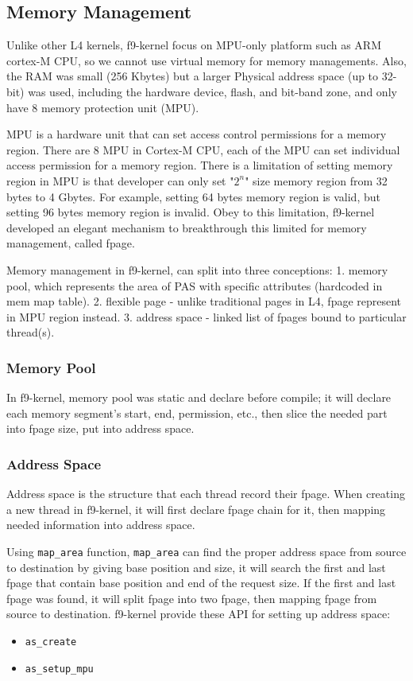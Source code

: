 \documentclass[10pt,preprint,nocopyrightspace]{sigplanconf}
\begin{document}
\subsection{Memory Management}

Unlike other L4 kernels, f9-kernel focus on MPU-only platform such as ARM cortex-M CPU, so we cannot use virtual memory for memory managements. Also, the RAM was small (256 Kbytes) but a larger Physical address space (up to 32-bit) was used, including the hardware device, flash, and bit-band zone, and only have 8 memory protection unit (MPU)\cite{arm2016mpu,yiu2013definitive,st2016managing,usna2015l18}.

MPU is a hardware unit that can set access control permissions for a memory region. There are 8 MPU in Cortex-M CPU, each of the MPU can set individual access permission for a memory region. There is a limitation of setting memory region in MPU is that developer can only set "$2^n$" size memory region from 32 bytes to 4 Gbytes\cite{yiu2013definitive,st2016managing}. For example, setting 64 bytes memory region is valid, but setting 96 bytes memory region is invalid. Obey to this limitation, f9-kernel developed an elegant mechanism to breakthrough this limited for memory management, called fpage.

Memory management in f9-kernel, can split into three conceptions: 1. memory pool, which represents the area of PAS with specific attributes (hardcoded in mem map table). 2. flexible page - unlike traditional pages in L4, fpage represent in MPU region instead. 3. address space - linked list of fpages bound to particular thread(s).

\subsubsection{Memory Pool}
In f9-kernel, memory pool was static and declare before compile; it will declare each memory segment's start, end, permission, etc., then slice the needed part into fpage size, put into address space.

\subsubsection{Address Space}
Address space is the structure that each thread record their fpage. When creating a new thread in f9-kernel, it will first declare fpage chain for it, then mapping needed information into address space.

Using \texttt{map{\_}area} function, \texttt{map{\_}area} can find the proper address space from source to destination by giving base position and size, it will search the first and last fpage that contain base position and end of the request size. If the first and last fpage was found, it will split fpage into two fpage, then mapping fpage from source to destination. f9-kernel provide these API for setting up address space: 
\begin{itemize}
\item \verb|as_create|
\item \verb|as_setup_mpu|
\end{itemize}
\end{document}
